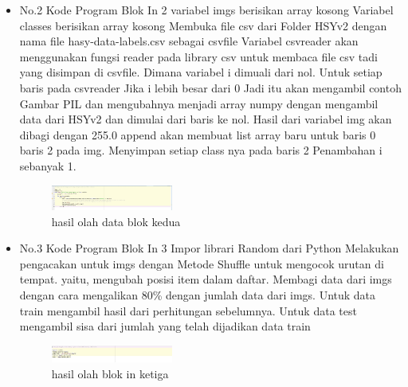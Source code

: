 \begin{enumerate}
\begin{itemize}
        \item {No.2 Kode Program Blok In 2}
        \subitem variabel imgs berisikan array kosong
        \subitem  Variabel classes berisikan array kosong
        \subitem Membuka file csv dari Folder HSYv2 dengan nama file hasy-data-labels.csv sebagai csvfile
        \subitem  Variabel csvreader akan menggunakan fungsi reader pada library csv untuk membaca file csv tadi yang disimpan di csvfile.
       \subitem  Dimana variabel i dimuali dari nol.
        \subitem  Untuk setiap baris pada  csvreader
        \subitem  Jika i lebih besar dari 0
        \subitem Jadi itu akan mengambil contoh Gambar PIL dan mengubahnya menjadi array numpy dengan mengambil data dari HSYv2 dan dimulai dari baris ke nol.
        \subitem  Hasil dari variabel img akan dibagi dengan 255.0
        \subitem append akan membuat list array baru untuk baris 0 baris 2 pada img.
        \subitem Menyimpan setiap class nya  pada baris 2
        \subitem  Penambahan i sebanyak 1. 
        \begin{figure}[H]
            \includegraphics[width=4cm]{figures/1174039/chapter7/praktek2.jpg}
            \centering
            \caption{hasil olah data blok kedua}
        \end{figure}
        
        \item {No.3 Kode Program Blok In 3}
        \subitem  Impor librari Random dari Python
        \subitem  Melakukan pengacakan untuk imgs dengan Metode Shuffle  untuk mengocok urutan di tempat. yaitu, mengubah posisi item dalam daftar.
        \subitem Membagi data dari imgs dengan cara mengalikan 80\% dengan jumlah data dari imgs.
        \subitem  Untuk data train mengambil hasil dari perhitungan sebelumnya.
        \subitem Untuk data test mengambil sisa dari jumlah yang telah dijadikan data train
        \begin{figure}[H]
            \includegraphics[width=4cm]{figures/1174039/chapter7/praktek3.jpg}
            \centering
            \caption{hasil olah blok in ketiga}
        \end{figure}
        

\end{itemize}
\end{enumerate}
